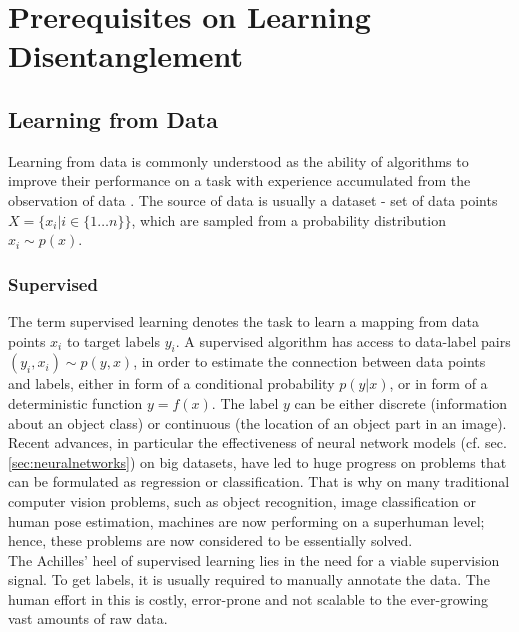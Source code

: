 \chapter{Prerequisites on Learning Disentanglement}

\section{Learning from Data}
	{Learning from data} is commonly understood as the ability of algorithms to improve their performance on a task with experience accumulated from the observation of data \cite{goodfellow16dlb}. The source of data is usually a dataset - set of data points $X = \{x_i | i \in \{1\ldots n\} \}$, which are sampled from a probability distribution $x_i \sim p(x)$.

	\subsection{Supervised}\label{sec:supervised}
		The term {supervised learning} denotes the task to learn a mapping from data points $x_i$ to target labels $y_i$.
		A supervised algorithm has access to data-label pairs  $(y_i, x_i) \sim p(y, x)$, in order to estimate the connection between data points and labels, either in form of a conditional probability $p(y|x)$, or in form of a deterministic function $y = f(x)$.
		The label $y$ can be either discrete (\eg information about an object class) or continuous (\eg the location of an object part in an image).
		Recent advances, in particular the effectiveness of neural network models (cf. sec. \ref{sec:neuralnetworks}) on big datasets, have led to huge progress on problems that can be formulated as regression or classification. That is why on many traditional computer vision problems, such as \eg object recognition, image classification or human pose estimation, machines are now performing on a superhuman level; hence, these problems are now considered to be essentially solved.\\
		The Achilles' heel of supervised learning lies in the need for a viable supervision signal. To get labels, it is usually required to manually annotate the data. The human effort in this is costly, error-prone and not scalable to the ever-growing vast amounts of raw data.

